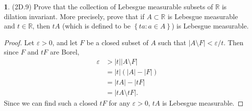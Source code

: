 \documentclass[12pt]{article}
\theoremstyle{definition}
\newtheorem{ex}{}
\begin{document}
\begin{ex}
	(2D.9)
	Prove that the collection of Lebesgue measurable subsets of $\mathbb{R}$ is dilation invariant.
	More precisely, prove that if $A \subset \mathbb{R}$ is Lebesgue measurable and $t \in \mathbb{R}$, then $tA$ (which is defined to be $\left\lbrace ta : a \in A \right\rbrace$) is Lebesgue measurable.
\end{ex}
\begin{proof}
	Let $\varepsilon > 0$, and let $F$ be a closed subset of $A$ such that $|A \setminus F| < \varepsilon/t$.
	Then since $F$ and $tF$ are Borel, \begin{align*}
    \varepsilon & > |t||A \setminus F|   \\
		 & = |t|(|A| - |F|)       \\
		 & = |tA| - |tF|        \\
		 & = |tA \setminus tF|.
	\end{align*}
  Since we can find such a closed $tF$ for any $\varepsilon > 0$, $tA$ is Lebesgue measurable.
\end{proof}
\end{document}
